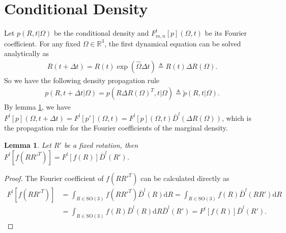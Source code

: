 \documentclass[10pt]{article}
\newtheorem{lemma}{Lemma}
\newcommand{\SO}{\ensuremath{\mathrm{SO}(3)}}
\newcommand{\diff}[1]{\mathrm{d}#1}
\newcommand{\real}{\ensuremath{\mathbb{R}}}
\begin{document}
\section{Conditional Density}

Let $p(R,t\lvert\Omega)$ be the conditional density and $F^l_{m,n}[p](\Omega,t)$ be its Fourier coefficient.
For any fixed $\Omega\in\real^3$, the first dynamical equation can be solved analytically as
\begin{align*}
	R(t+\Delta t) = R(t)\exp(\hat{\Omega}\Delta t) \triangleq R(t)\Delta R(\Omega).
\end{align*}
So we have the following density propagation rule
\begin{align*}
	p(R,t+\Delta t\lvert\Omega) = p(R\Delta R(\Omega)^T, t\lvert\Omega) \triangleq \tilde{p}(R,t\lvert\Omega).
\end{align*}
By lemma \ref{lemma:fixed rotation}, we have $F^l[p](\Omega,t+\Delta t) = F^l[p'](\Omega,t) = F^l[p](\Omega,t)\bar{D}^l(\Delta R(\Omega))$, which is the propagation rule for the Fourier coefficients of the marginal density.
\begin{lemma} \label{lemma:fixed rotation}
	Let $R'$ be a fixed rotation, then $F^l[f(RR'^T)] = F^l[f(R)]\bar{D}^l(R')$.
\end{lemma}
\begin{proof}
	The Fourier coefficient of $f(RR'^T)$ can be calculated directly as
	\begin{align*}
		F^l[f(RR'^T)] &= \int_{R\in\SO} f(RR'^T) \bar{D}^l(R) \diff{R} = \int_{R\in\SO} f(R) \bar{D}^l(RR') \diff{R} \\
		&= \int_{R\in\SO} f(R) \bar{D}^l(R) \diff{R} \bar{D}^l(R') = F^l[f(R)]\bar{D}^l(R').
	\end{align*}
\end{proof}
\end{document}
